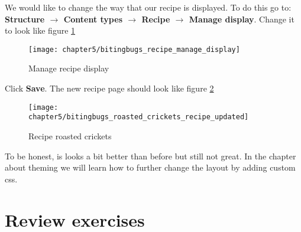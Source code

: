   We would like to change the way that our recipe is displayed. To do this go to: \textbf{Structure $\rightarrow$ Content types $\rightarrow$ Recipe $\rightarrow$ Manage display}. Change it to look like figure \ref{fig:bitingbugs_recipe_manage_display}
 
  \begin{figure}[H]
  	\centering
  	\texttt{[image: chapter5/bitingbugs\_recipe\_manage\_display]}
  	\caption{Manage recipe display}
  	\label{fig:bitingbugs_recipe_manage_display}
  \end{figure}
  
  Click \textbf{Save}. The new recipe page should look like figure \ref{fig:bitingbugs_roasted_crickets_recipe_updated}
  
  \begin{figure}[H]
  	\centering
  	\texttt{[image: chapter5/bitingbugs\_roasted\_crickets\_recipe\_updated]}
  	\caption{Recipe roasted crickets}
  	\label{fig:bitingbugs_roasted_crickets_recipe_updated}
  \end{figure}
  
  To be honest, is looks a bit better than before but still not great. In the chapter about theming we will learn how to further change the layout by adding custom css.
  
  \section{Review exercises}
  
